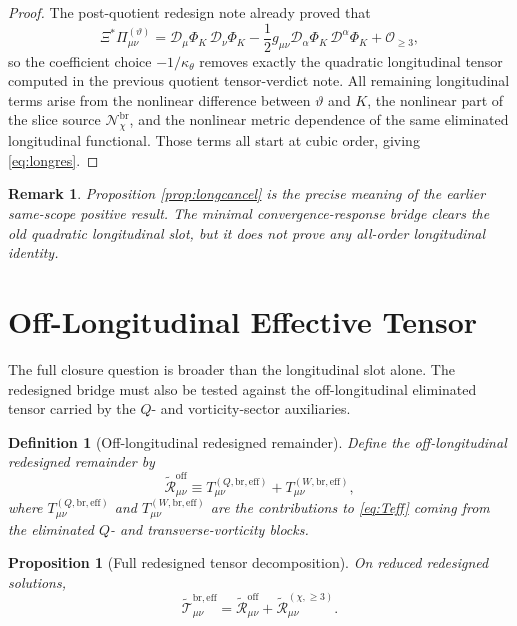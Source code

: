 \documentclass[11pt]{article}
\newcommand{\Dperp}{\mathcal D}
\newcommand{\PiTheta}{\Pi^{(\vartheta)}}
\newcommand{\ReEff}{\widetilde{\mathcal T}_{\mu\nu}^{\mathrm{br,eff}}}
\newcommand{\ReLong}{\widetilde{\mathcal R}_{\mu\nu}^{(\chi,\ge 3)}}
\newcommand{\ReOff}{\widetilde{\mathcal R}_{\mu\nu}^{\mathrm{off}}}
\newtheorem{definition}{Definition}
\newtheorem{proposition}{Proposition}
\newtheorem{remark}{Remark}
\begin{document}
\begin{proof}
The post-quotient redesign note already proved that
\[
\Xi^\ast\PiTheta_{\mu\nu}
=
\Dperp_\mu\Phi_K\,\Dperp_\nu\Phi_K
-\frac12 g_{\mu\nu}\Dperp_\alpha\Phi_K\,\Dperp^\alpha\Phi_K
+\mathcal O_{\ge 3},
\]
so the coefficient choice \(-1/\kappa_\theta\) removes exactly the quadratic longitudinal tensor computed in the previous quotient tensor-verdict note. All remaining longitudinal terms arise from the nonlinear difference between \(\vartheta\) and \(K\), the nonlinear part of the slice source \(\mathcal N_\chi^{\mathrm{br}}\), and the nonlinear metric dependence of the same eliminated longitudinal functional. Those terms all start at cubic order, giving \eqref{eq:longres}.
\end{proof}

\begin{remark}
Proposition \ref{prop:longcancel} is the precise meaning of the earlier same-scope positive result. The minimal convergence-response bridge clears the old quadratic longitudinal slot, but it does not prove any all-order longitudinal identity.
\end{remark}

\section{Off-Longitudinal Effective Tensor}

The full closure question is broader than the longitudinal slot alone. The redesigned bridge must also be tested against the off-longitudinal eliminated tensor carried by the \(Q\)- and vorticity-sector auxiliaries.

\begin{definition}[Off-longitudinal redesigned remainder]
\label{def:off}
Define the \emph{off-longitudinal redesigned remainder} by
\begin{equation}
\ReOff
\equiv
T_{\mu\nu}^{(Q,\mathrm{br,eff})}
+T_{\mu\nu}^{(W,\mathrm{br,eff})},
\label{eq:off}
\end{equation}
where \(T_{\mu\nu}^{(Q,\mathrm{br,eff})}\) and \(T_{\mu\nu}^{(W,\mathrm{br,eff})}\) are the contributions to \eqref{eq:Teff} coming from the eliminated \(Q\)- and transverse-vorticity blocks.
\end{definition}

\begin{proposition}[Full redesigned tensor decomposition]
\label{prop:decomp}
On reduced redesigned solutions,
\begin{equation}
\ReEff
=
\ReOff+\ReLong.
\label{eq:decomp}
\end{equation}
\end{proposition}
\end{document}
